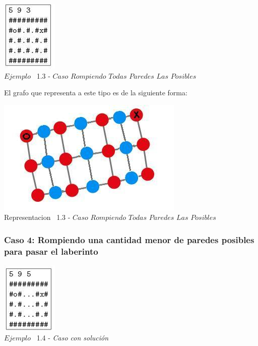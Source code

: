 \vspace*{0.3cm} \vspace*{0.3cm}
  \begin{center}
 \includegraphics[scale=1.6]{./EJ1/ej1rompertodasparedes.jpeg}
\\ {$Ejemplo$ \ 1.3 - $Caso$ $Rompiendo$ $Todas$ $Paredes$ $Las$ $Posibles$}
  \end{center}
  \vspace*{0.3cm}

El grafo que representa a este tipo es de la siguiente forma:\\

\vspace*{0.3cm} \vspace*{0.3cm}
  \begin{center}
 \includegraphics[scale=0.5]{./EJ1/ej1grafosolucionconpared.jpeg}
 \\{Representacion \ 1.3 - $Caso$ $Rompiendo$ $Todas$ $Paredes$ $Las$ $Posibles$}
  \end{center}
  \vspace*{0.3cm}

\begin{center}
  \subsubsection*{Caso 4: Rompiendo una cantidad menor de paredes posibles para pasar el laberinto}
\end{center}

\vspace*{0.3cm} \vspace*{0.3cm}
  \begin{center}
 \includegraphics[scale=1.6]{./EJ1/ej1random.jpeg}
\\ {$Ejemplo$ \ 1.4 - \textit{Caso con solución}}
  \end{center}
  \vspace*{0.3cm}

